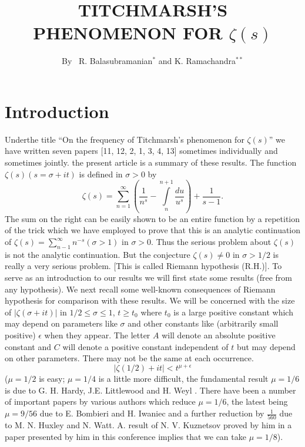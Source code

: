
\title{TITCHMARSH'S PHENOMENON FOR $\zeta (s)$}

\author{By~ R. Balasubramanian$^\ast$ and K. Ramachandra$^{\ast\ast}$}

\date{}
\maketitle

\setcounter{page}{15}
\setcounter{pageoriginal}{12} 

\section{Introduction}\label{art2-sec1}
Under\pageoriginale  the title ``On the frequency of Titchmarsh's phenomenon for $\zeta(s)$'' we have written seven papers [11, 12, 2, 1, 3, 4, 13] sometimes individually and sometimes jointly. the present article is a summary of these results. The function $\zeta(s) (s = \sigma + it)$ is defined in $\sigma > 0$ by 
$$
\zeta(s) = \sum\limits^\infty_{n=1} \left(\frac{1}{n^s} - \int\limits^{n+1}_n \frac{du}{u^s} \right) + \frac{1}{s-1}. 
$$
The sum on the right can be easily shown to be an entire function by a repetition of the trick which we have employed to prove that this is an analytic continuation of $\zeta(s) = \sum\limits^\infty_{n-1} n^{-s} (\sigma >1)$ in $\sigma >0$. Thus the serious problem about $\zeta(s)$ is not the analytic continuation. But the conjecture $\zeta(s) \neq 0$ in $\sigma > 1/2$ is really a very serious problem. [This is called Riemann hypothesis (R.H.)]. To serve as an introduction to our results we will first state some results (free from any hypothesis). We next recall some well-known consequences of Riemann hypothesis for comparison with these results. We will be concerned with the size of $|\zeta(\sigma + it)|$ in $1/2 \leqslant \sigma \leqslant 1$, $t \geqslant t_0$ where $t_0$ is a large positive constant which may depend on parameters like $\sigma$ and other constants like (arbitrarily small positive) $\epsilon$ when they appear. The letter $A$ will denote an absolute positive constant and $C$ will denote a positive constant independent of $t$ but may depend on other parameters. There may not be the same at each occurrence. 
\begin{equation}
|\zeta(1/2) + it| < t^{\mu+ \epsilon} \label{art2-eq1}
\end{equation}
($\mu = 1/2$ is easy; $\mu = 1/4$ is a little more difficult, the fundamental result $\mu = 1/6$ is due to G. H. Hardy, J.E. Littlewood and H. Weyl \cite{art2-key19}. There have been a number of important papers by various authors which reduce $\mu =1/6$, the latest being $\mu = 9/56$ due to E. Bombieri and H. Iwaniec \cite{art2-key7} and a further reduction by $\frac{1}{560}$ due to M. N. Huxley and N. Watt. A. result of N. V. Kuznetsov proved by him in a paper presented by him in this conference implies that we can take $\mu = 1/8$).
